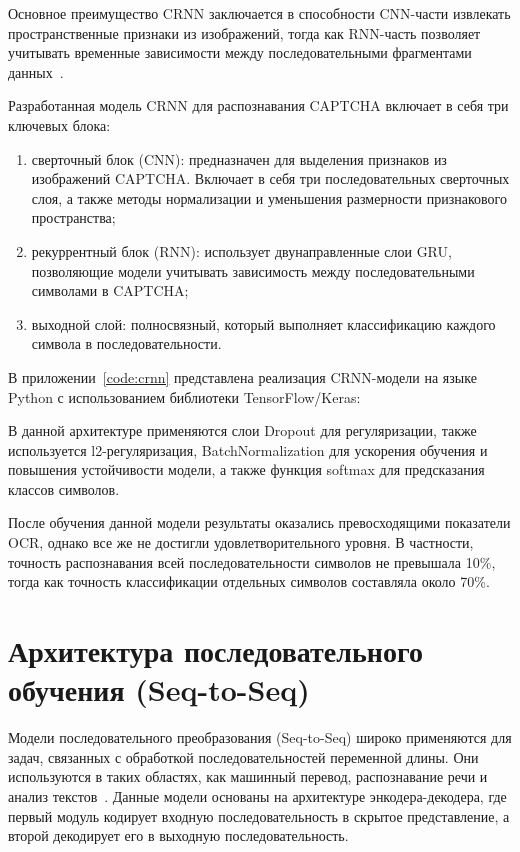 \documentclass{altsu-report}
\begin{document}
Основное преимущество CRNN заключается в способности CNN-части извлекать пространственные признаки из изображений, тогда как RNN-часть позволяет учитывать временные зависимости между последовательными фрагментами данных~\cite{CRNNBook}.

Разработанная модель CRNN для распознавания CAPTCHA включает в себя три ключевых блока:
\begin{enumerate}
    \item сверточный блок (CNN): предназначен для выделения признаков из изображений CAPTCHA. Включает в себя три последовательных сверточных слоя, а также методы нормализации и уменьшения размерности признакового пространства;
    \item рекуррентный блок (RNN): использует двунаправленные слои GRU, позволяющие модели учитывать зависимость между последовательными символами в CAPTCHA;
    \item выходной слой: полносвязный, который выполняет классификацию каждого символа в последовательности.
\end{enumerate}

В приложении~\ref{code:crnn} представлена реализация CRNN-модели на языке Python с использованием библиотеки TensorFlow/Keras:

В данной архитектуре применяются слои Dropout для регуляризации, также используется l2-регуляризация, BatchNormalization для ускорения обучения и повышения устойчивости модели, а также функция softmax для предсказания классов символов.

После обучения данной модели результаты оказались превосходящими показатели OCR, однако все же не достигли удовлетворительного уровня. В частности, точность распознавания всей последовательности символов не превышала 10\%, тогда как точность классификации отдельных символов составляла около 70\%.

\chapter{Архитектура последовательного обучения (Seq-to-Seq)}

Модели последовательного преобразования (Seq-to-Seq) широко применяются для задач, связанных с обработкой последовательностей переменной длины. Они используются в таких областях, как машинный перевод, распознавание речи и анализ текстов~\cite{Seq2Seq}. Данные модели основаны на архитектуре энкодера-декодера, где первый модуль кодирует входную последовательность в скрытое представление, а второй декодирует его в выходную последовательность.
\end{document}
